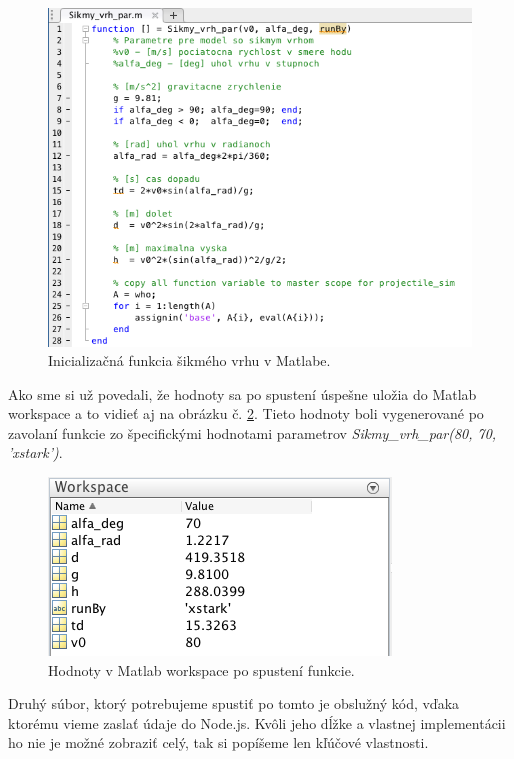 \begin{figure}[H]
  \centering
  \includegraphics[scale=0.7]{img/code/matlab-function.png}
  \caption{Inicializačná funkcia šikmého vrhu v Matlabe.}
  \label{img-matlab-function}
\end{figure}

Ako sme si už povedali, že hodnoty sa po spustení úspešne uložia do Matlab workspace a to vidieť aj na obrázku č. \ref{matlab-function-workspace}. Tieto hodnoty boli vygenerované po zavolaní funkcie zo špecifickými hodnotami parametrov \textit{Sikmy\_vrh\_par(80, 70, 'xstark')}.

\begin{figure}[H]
  \centering
  \includegraphics[scale=0.7]{img/code/matlab-function-workspace.png}
  \caption{Hodnoty v Matlab workspace po spustení funkcie.}
  \label{matlab-function-workspace}
\end{figure}

Druhý súbor, ktorý potrebujeme spustiť po tomto je obslužný kód, vďaka ktorému vieme zaslať údaje do Node.js. Kvôli jeho dĺžke a vlastnej implementácii ho nie je možné zobraziť celý, tak si popíšeme len kľúčové vlastnosti.


